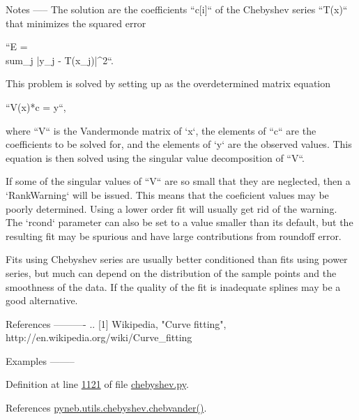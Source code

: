 \begin{DoxyVerb}
Notes
-----
The solution are the coefficients ``c[i]`` of the Chebyshev series
``T(x)`` that minimizes the squared error

``E = \\sum_j |y_j - T(x_j)|^2``.

This problem is solved by setting up as the overdetermined matrix
equation

``V(x)*c = y``,

where ``V`` is the Vandermonde matrix of `x`, the elements of ``c`` are
the coefficients to be solved for, and the elements of `y` are the
observed values.  This equation is then solved using the singular value
decomposition of ``V``.

If some of the singular values of ``V`` are so small that they are
neglected, then a `RankWarning` will be issued. This means that the
coeficient values may be poorly determined. Using a lower order fit
will usually get rid of the warning.  The `rcond` parameter can also be
set to a value smaller than its default, but the resulting fit may be
spurious and have large contributions from roundoff error.

Fits using Chebyshev series are usually better conditioned than fits
using power series, but much can depend on the distribution of the
sample points and the smoothness of the data. If the quality of the fit
is inadequate splines may be a good alternative.

References
----------
.. [1] Wikipedia, "Curve fitting",
       http://en.wikipedia.org/wiki/Curve_fitting

Examples
--------\end{DoxyVerb}
 

Definition at line \hyperlink{chebyshev_8py_source_l01121}{1121} of file \hyperlink{chebyshev_8py_source}{chebyshev.\-py}.



References \hyperlink{chebyshev_8py_source_l01078}{pyneb.\-utils.\-chebyshev.\-chebvander()}.


